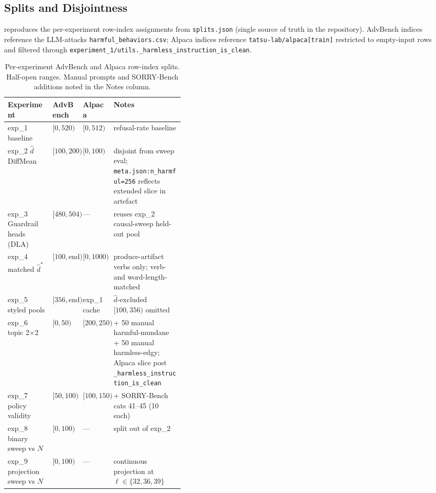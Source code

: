 \documentclass[10pt,twocolumn]{article}
\newcommand{\dhat}{\hat{d}}
\newcommand{\dhatstar}{\hat{d}^{*}}
\newcommand{\layerL}{\ell}
\newcommand{\Ncontext}{N}
\newcommand{\advbench}{AdvBench}
\newcommand{\alpaca}{Alpaca}
\newcommand{\sorrybench}{SORRY-Bench}
\theoremstyle{definition}
\begin{document}
\subsection{Splits and Disjointness}
\label{app:splits}

 reproduces the per-experiment row-index assignments
from \texttt{splits.json} (single source of truth in the repository).
\advbench{} indices reference the LLM-attacks
\texttt{harmful\_behaviors.csv}; \alpaca{} indices reference
\texttt{tatsu-lab/alpaca[train]} restricted to empty-input rows and
filtered through
\texttt{experiment\_1/utils.\_harmless\_instruction\_is\_clean}.

\begin{table}[!tbp]
\centering\small
\begin{tabular}{lllp{0.40\linewidth}}
\toprule
Experiment & \advbench{} & \alpaca{} & Notes \\
\midrule
exp\_1 baseline                  & $[0, 520)$           & $[0, 512)$       & refusal-rate baseline \\
exp\_2 $\dhat$ DiffMean          & $[100, 200)$         & $[0, 100)$       & disjoint from sweep eval; \texttt{meta.json:n\_harmful=256} reflects extended slice in artefact \\
exp\_3 Guardrail heads (DLA)     & $[480, 504)$         & ---              & reuses exp\_2 causal-sweep held-out pool \\
exp\_4 matched $\dhatstar$       & $[100, \text{end})$  & $[0, 1000)$      & produce-artifact verbs only; verb- and word-length-matched \\
exp\_5 styled pools              & $[356, \text{end})$  & exp\_1 cache     & $\dhat$-excluded $[100, 356)$ omitted \\
exp\_6 topic 2$\times$2          & $[0, 50)$            & $[200, 250)$     & + 50 manual harmful-mundane + 50 manual harmless-edgy; \alpaca{} slice post \texttt{\_harmless\_instruction\_is\_clean} \\
exp\_7 policy validity           & $[50, 100)$          & $[100, 150)$     & + \sorrybench{} cats 41--45 (10 each) \\
exp\_8 binary sweep vs $\Ncontext$ & $[0, 100)$         & ---              & split out of exp\_2 \\
exp\_9 projection sweep vs $\Ncontext$ & $[0, 100)$     & ---              & continuous projection at $\layerL{\in}\{32, 36, 39\}$ \\
\bottomrule
\end{tabular}
\caption{Per-experiment \advbench{} and \alpaca{} row-index splits.
Half-open ranges. Manual prompts and \sorrybench{} additions noted in
the Notes column.}
\label{tab:splits}
\end{table}
\end{document}

